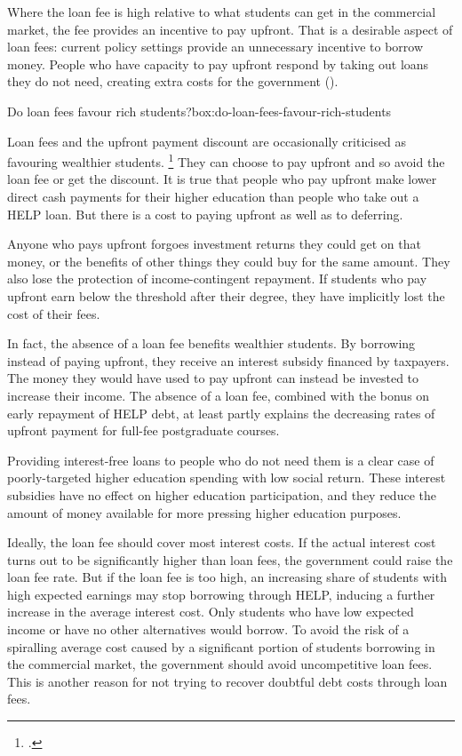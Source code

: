\documentclass[embargoed]{grattan}
\begin{document}
{Where the loan fee is high relative to what students can get in the commercial market, the fee provides an incentive to pay upfront.
That is a desirable aspect of loan fees: current policy settings provide an unnecessary incentive to borrow money.
People who have capacity to pay upfront respond by taking out loans they do not need, creating extra costs for the government ().

\begin{smallbox}{Do loan fees favour rich students?}{box:do-loan-fees-favour-rich-students}

Loan fees and the upfront payment discount are occasionally criticised as favouring wealthier students.%
\footcites{Hare-2015-loan-fees-advantage-the-rich}{Evans2011MediareleaseGillard} %
They can choose to pay upfront and so avoid the loan fee or get the discount.
It is true that people who pay upfront make lower direct cash payments for their higher education than people who take out a \gls{HELP} loan.
But there is a cost to paying upfront as well as to deferring.

Anyone who pays upfront forgoes investment returns they could get on that money, or the benefits of other things they could buy for the same amount.
They also lose the protection of income-contingent repayment.
If students who pay upfront earn below the threshold after their degree, they have implicitly lost the cost of their fees.

In fact, the absence of a loan fee benefits wealthier students.
By borrowing instead of paying upfront, they receive an interest subsidy financed by taxpayers.
The money they would have used to pay upfront can instead be invested to increase their income.
The absence of a loan fee, combined with the bonus on early repayment of \gls{HELP} debt, at least partly explains the decreasing rates of upfront payment for full-fee postgraduate courses.

Providing interest-free loans to people who do not need them is a clear case of poorly-targeted higher education spending with low social return.
These interest subsidies have no effect on higher education participation, and they reduce the amount of money available for more pressing higher education purposes.
\end{smallbox}

Ideally, the loan fee should cover most interest costs.
If the actual interest cost turns out to be significantly higher than loan fees, the government could raise the loan fee rate.
But if the loan fee is too high, an increasing share of students with high expected earnings may stop borrowing through \gls{HELP}, inducing a further increase in the average interest cost.
Only students who have low expected income or have no other alternatives would borrow.
To avoid the risk of a spiralling average cost caused by a significant portion of students borrowing in the commercial market, the government should avoid uncompetitive loan fees.
This is another reason for not trying to recover doubtful debt costs through loan fees.

}
\end{document}

